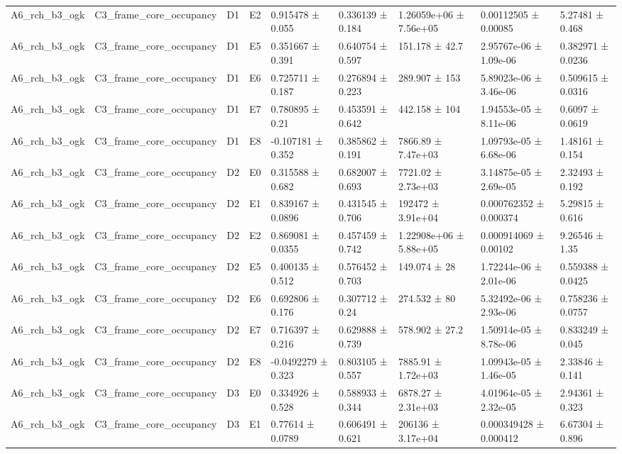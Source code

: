 \begin{table}
\begin{tabular}{lllllllll}
A6\_rch\_b3\_ogk & C3\_frame\_core\_occupancy & D1 & E2 & 0.915478 ± 0.055 & 0.336139 ± 0.184 & 1.26059e+06 ± 7.56e+05 & 0.00112505 ± 0.00085 & 5.27481 ± 0.468 \\
A6\_rch\_b3\_ogk & C3\_frame\_core\_occupancy & D1 & E5 & 0.351667 ± 0.391 & 0.640754 ± 0.597 & 151.178 ± 42.7 & 2.95767e-06 ± 1.09e-06 & 0.382971 ± 0.0236 \\
A6\_rch\_b3\_ogk & C3\_frame\_core\_occupancy & D1 & E6 & 0.725711 ± 0.187 & 0.276894 ± 0.223 & 289.907 ± 153 & 5.89023e-06 ± 3.46e-06 & 0.509615 ± 0.0316 \\
A6\_rch\_b3\_ogk & C3\_frame\_core\_occupancy & D1 & E7 & 0.780895 ± 0.21 & 0.453591 ± 0.642 & 442.158 ± 104 & 1.94553e-05 ± 8.11e-06 & 0.6097 ± 0.0619 \\
A6\_rch\_b3\_ogk & C3\_frame\_core\_occupancy & D1 & E8 & -0.107181 ± 0.352 & 0.385862 ± 0.191 & 7866.89 ± 7.47e+03 & 1.09793e-05 ± 6.68e-06 & 1.48161 ± 0.154 \\
A6\_rch\_b3\_ogk & C3\_frame\_core\_occupancy & D2 & E0 & 0.315588 ± 0.682 & 0.682007 ± 0.693 & 7721.02 ± 2.73e+03 & 3.14875e-05 ± 2.69e-05 & 2.32493 ± 0.192 \\
A6\_rch\_b3\_ogk & C3\_frame\_core\_occupancy & D2 & E1 & 0.839167 ± 0.0896 & 0.431545 ± 0.706 & 192472 ± 3.91e+04 & 0.000762352 ± 0.000374 & 5.29815 ± 0.616 \\
A6\_rch\_b3\_ogk & C3\_frame\_core\_occupancy & D2 & E2 & 0.869081 ± 0.0355 & 0.457459 ± 0.742 & 1.22908e+06 ± 5.88e+05 & 0.000914069 ± 0.00102 & 9.26546 ± 1.35 \\
A6\_rch\_b3\_ogk & C3\_frame\_core\_occupancy & D2 & E5 & 0.400135 ± 0.512 & 0.576452 ± 0.703 & 149.074 ± 28 & 1.72244e-06 ± 2.01e-06 & 0.559388 ± 0.0425 \\
A6\_rch\_b3\_ogk & C3\_frame\_core\_occupancy & D2 & E6 & 0.692806 ± 0.176 & 0.307712 ± 0.24 & 274.532 ± 80 & 5.32492e-06 ± 2.93e-06 & 0.758236 ± 0.0757 \\
A6\_rch\_b3\_ogk & C3\_frame\_core\_occupancy & D2 & E7 & 0.716397 ± 0.216 & 0.629888 ± 0.739 & 578.902 ± 27.2 & 1.50914e-05 ± 8.78e-06 & 0.833249 ± 0.045 \\
A6\_rch\_b3\_ogk & C3\_frame\_core\_occupancy & D2 & E8 & -0.0492279 ± 0.323 & 0.803105 ± 0.557 & 7885.91 ± 1.72e+03 & 1.09943e-05 ± 1.46e-05 & 2.33846 ± 0.141 \\
A6\_rch\_b3\_ogk & C3\_frame\_core\_occupancy & D3 & E0 & 0.334926 ± 0.528 & 0.588933 ± 0.344 & 6878.27 ± 2.31e+03 & 4.01964e-05 ± 2.32e-05 & 2.94361 ± 0.323 \\
A6\_rch\_b3\_ogk & C3\_frame\_core\_occupancy & D3 & E1 & 0.77614 ± 0.0789 & 0.606491 ± 0.621 & 206136 ± 3.17e+04 & 0.000349428 ± 0.000412 & 6.67304 ± 0.896 \\

\end{tabular}
\end{table}
